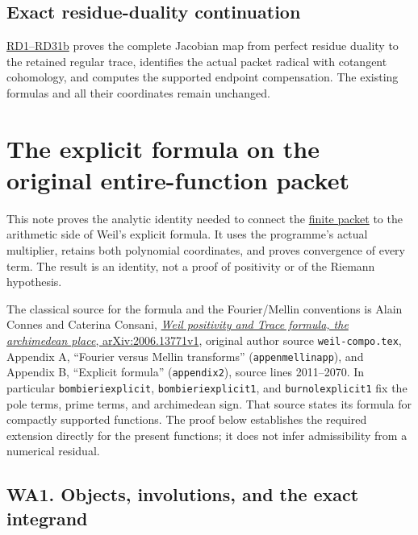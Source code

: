 \documentclass[
  10pt,
  a4paper,
]{article}
\begin{document}
\subsection{Exact residue-duality
continuation}\label{exact-residue-duality-continuation}

\href{COLLISION_RESIDUE_DUALITY_DERIVATION.md}{RD1--RD31b} proves the
complete Jacobian map from perfect residue duality to the retained
regular trace, identifies the actual packet radical with cotangent
cohomology, and computes the supported endpoint compensation. The
existing formulas and all their coordinates remain unchanged.

\clearpage

\section{The explicit formula on the original entire-function
packet}\label{the-explicit-formula-on-the-original-entire-function-packet}

This note proves the analytic identity needed to connect the
\href{https://github.com/KokunoYumeto/zeta-function-research-reader/blob/173dbc6ed5a03235dbe7654f928f3692107db39b/workbenches/splitzero-tandem/branches/tau-zero-prime-positivity/WEIL_PACKET_DERIVATION.md}{finite
packet} to the arithmetic side of Weil's explicit formula. It uses the
programme's actual multiplier, retains both polynomial coordinates, and
proves convergence of every term. The result is an identity, not a proof
of positivity or of the Riemann hypothesis.

The classical source for the formula and the Fourier/Mellin conventions
is Alain Connes and Caterina Consani,
\href{https://arxiv.org/abs/2006.13771v1}{\emph{Weil positivity and
Trace formula, the archimedean place}, arXiv:2006.13771v1}, original
author source \texttt{weil-\allowbreak{}compo.\allowbreak{}tex}, Appendix A, ``Fourier versus
Mellin transforms'' (\texttt{appenmellinapp}), and Appendix B,
``Explicit formula'' (\texttt{appendix2}), source lines 2011--2070. In
particular \texttt{bombieriexplicit}, \texttt{bombieriexplicit1}, and
\texttt{burnolexplicit1} fix the pole terms, prime terms, and
archimedean sign. That source states its formula for compactly supported
functions. The proof below establishes the required extension directly
for the present functions; it does not infer admissibility from a
numerical residual.

\subsection{WA1. Objects, involutions, and the exact
integrand}\label{wa1.-objects-involutions-and-the-exact-integrand}
\end{document}
